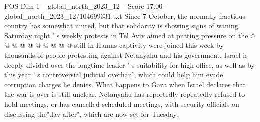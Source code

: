 \begin{textsample}{POS Dim 1 – global\_north\_2023\_12 – Score 17.00 – global\_north\_2023\_12/104699331.txt}
Since 7 October, the normally fractious country has somewhat united, but that solidarity is showing signs of waning.
Saturday night ' s weekly protests in Tel Aviv aimed at putting pressure on the @ @ @ @ @ @ @ @ @ @ still in Hamas captivity were joined this week by thousands of people protesting against Netanyahu and his government.
Israel is deeply divided over the longtime leader ' s suitability for high office, as well as by this year ' s controversial judicial overhaul, which could help him evade corruption charges he denies.
What happens to Gaza when Israel declares that the war is over is still unclear.
Netanyahu has reportedly repeatedly refused to hold meetings, or has cancelled scheduled meetings, with security officials on discussing the"day after", which are now set for Tuesday.

\end{textsample}

